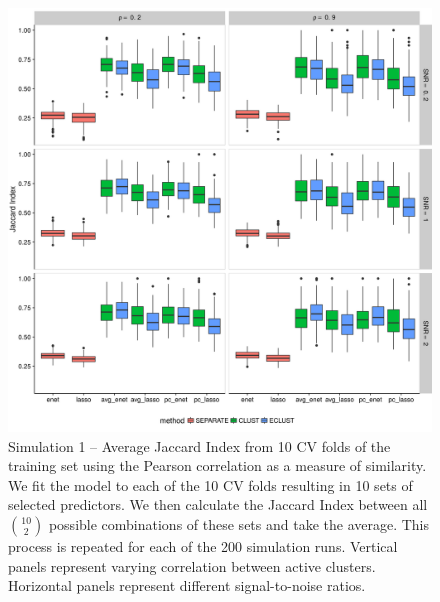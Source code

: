 \begin{appendices}
\begin{figure}[H]
	\centering
	\includegraphics[scale=0.6, keepaspectratio]{./figs/hydra/results/figures/sim1-sept10/jacc_Correlation_sim1.png}
	\caption{Simulation 1 -- Average Jaccard Index from 10 CV folds of the training set using the Pearson correlation as a measure of similarity. We fit the model to each of the 10 CV folds resulting in 10 sets of selected predictors. We then calculate the Jaccard Index between all $\binom{10}{2}$ possible combinations of these sets and take the average. This process is repeated for each of the 200 simulation runs. Vertical panels represent varying correlation between active clusters. Horizontal panels represent different signal-to-noise ratios.}
	\label{fig:jacc_Correlation_sim1}
\end{figure}



\end{appendices}
